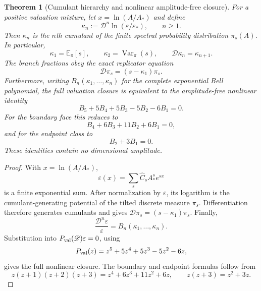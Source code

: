 \documentclass[aps,prd,preprint,onecolumn,nofootinbib,superscriptaddress,showkeys]{revtex4-2}
\numberwithin{equation}{section}
\theoremstyle{definition}
\theoremstyle{plain}
\newtheorem{theorem}{Theorem}[section]
\newcommand{\Dil}{\mathscr D}
\begin{document}
\begin{theorem}[Cumulant hierarchy and nonlinear amplitude-free closure]\label{thm:cumulants}
For a positive valuation mixture, let $x=\ln(A/A_*)$ and define
\begin{equation}
\kappa_n:=\Dil^n\ln(\varepsilon/\varepsilon_*),
\qquad n\ge1.
\end{equation}
Then $\kappa_n$ is the $n$th cumulant of the finite spectral probability distribution $\pi_s(A)$.  In particular,
\begin{equation}
\kappa_1=\mathbb E_\pi[s],
\qquad
\kappa_2=\operatorname{Var}_\pi(s),
\qquad
\Dil\kappa_n=\kappa_{n+1}.
\end{equation}
The branch fractions obey the exact replicator equation
\begin{equation}
\boxed{
\Dil\pi_s=(s-\kappa_1)\pi_s.
}
\end{equation}
Furthermore, writing $B_n(\kappa_1,\ldots,\kappa_n)$ for the complete exponential Bell polynomial, the full valuation closure is equivalent to the amplitude-free nonlinear identity
\begin{equation}
\boxed{
B_5+5B_4+5B_3-5B_2-6B_1=0.
}
\end{equation}
For the boundary face this reduces to
\begin{equation}
\boxed{
B_4+6B_3+11B_2+6B_1=0,
}
\end{equation}
and for the endpoint class to
\begin{equation}
\boxed{
B_2+3B_1=0.
}
\end{equation}
These identities contain no dimensional amplitude.
\end{theorem}

\begin{proof}
With $x=\ln(A/A_*)$,
\[
\varepsilon(x)=\sum_s \widehat C_sA_*^s e^{sx}
\]
is a finite exponential sum.  After normalization by $\varepsilon$, its logarithm is the cumulant-generating potential of the tilted discrete measure $\pi_s$.  Differentiation therefore generates cumulants and gives $\Dil\pi_s=(s-\kappa_1)\pi_s$.  Finally,
\[
\frac{\Dil^n\varepsilon}{\varepsilon}=B_n(\kappa_1,\ldots,\kappa_n).
\]
Substitution into $P_{\rm val}(\Dil)\varepsilon=0$, using
\[
P_{\rm val}(z)=z^5+5z^4+5z^3-5z^2-6z,
\]
gives the full nonlinear closure.  The boundary and endpoint formulas follow from
\[
z(z+1)(z+2)(z+3)=z^4+6z^3+11z^2+6z,
\qquad
z(z+3)=z^2+3z.
\]
\end{proof}
\end{document}
